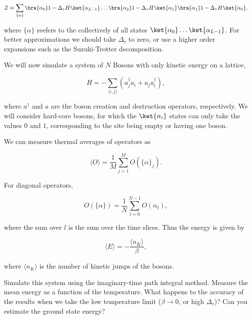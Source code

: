 \documentclass[%
oneside,                 %
final,                   %
10pt]{article}
\begin{document}
\begin{equation*}
    Z \approx \sum_{\{\alpha\}} \bra{\alpha_0} 1 - \Delta_\tau H \ket{\alpha_{L-1}} \hdots \bra{\alpha_2} 1 - \Delta_\tau H \ket{\alpha_1} \bra{\alpha_1} 1 - \Delta_\tau H \ket{\alpha_0},
\end{equation*}

where \(\{\alpha\}\) reefers to the collectively of all states \(\ket{\alpha_0} \hdots \ket{\alpha_{L-1}}\). For better approximations we should take \(\Delta_\tau\) to zero, or use a higher order expansions such as the Suzuki-Trotter decomposition.

We will now simulate a system of \(N\) Bosons with only kinetic energy on a lattice,

\begin{equation*}
    H = - \sum_{\langle i, j \rangle} (a^\dagger_j a_i + a_j a^\dagger_i),
\end{equation*}

where \(a^\dagger\) and \(a\) are the boson creation and destruction
operators, respectively. We will consider hard-core bosons, for which
the \(\ket{\alpha_i}\) states can only take the values \(0\) and
\(1\), corresponding to the site being empty or having one boson.

We can measure thermal averages of operators as 

\begin{equation*}
    \langle O \rangle = \frac{1}{M} \sum_{j=1}^M O(\{\alpha\}_j).
\end{equation*}

For diagonal operators, 

\begin{equation*}
    O(\{\alpha\}) = \frac{1}{N} \sum_{l=0}^{N-1} O(\alpha_l),
\end{equation*}

where the sum over \(l\) is the sum over the time slices. Thus the energy is given by

\begin{equation*}
    \langle E \rangle = - \frac{\langle n_K \rangle}{\beta},
\end{equation*}

where \(\langle n_K \rangle\) is the number of kinetic jumps of the bosons.

Simulate this system using the imaginary-time path integral
method. Measure the mean energy as a function of the temperature. What
happens to the accuracy of the results when we take the low
temperature limit (\(\beta \rightarrow 0\), or high \(\Delta_\tau\))?
Can you estimate the ground state energy?
\end{document}
